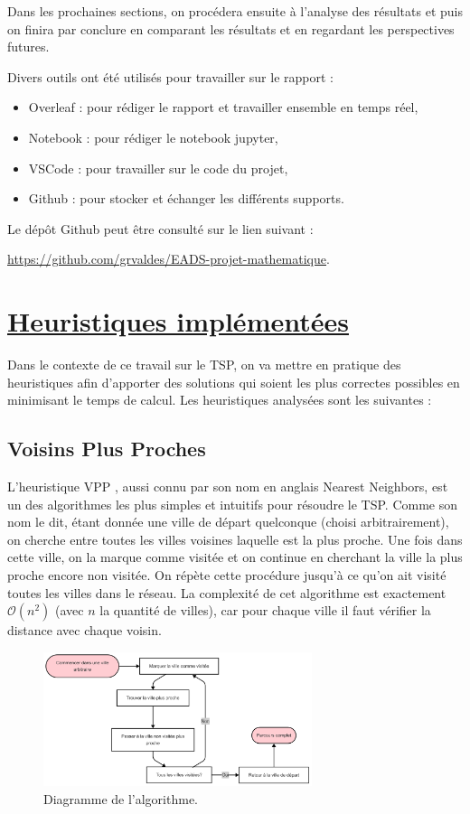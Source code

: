 \documentclass[a4paper,11pt,fleqn]{article}
\begin{document}
Dans les prochaines sections, on procédera ensuite à l’analyse des résultats et puis on finira par conclure en comparant les résultats et en regardant les perspectives futures.
\newline

Divers outils ont été utilisés pour travailler sur le rapport :
\begin{itemize}[noitemsep,topsep=5pt]
    \item Overleaf : pour rédiger le rapport et travailler ensemble en temps réel,
    \item Notebook : pour rédiger le notebook jupyter,
    \item VSCode : pour travailler sur le code du projet,
    \item Github : pour stocker et échanger les différents supports.
\end{itemize}

Le dépôt Github peut être consulté sur le lien suivant :

\noindent \url{https://github.com/grvaldes/EADS-projet-mathematique}.

\section*{\underline{Heuristiques implémentées}}
Dans le contexte de ce travail sur le TSP,  on va mettre en pratique des heuristiques afin d’apporter des solutions qui soient les plus correctes possibles en minimisant le temps de calcul.
Les heuristiques analysées sont les suivantes :
\subsection*{Voisins Plus Proches}
L'heuristique VPP \cite{article:nearest}, aussi connu par son nom en anglais Nearest Neighbors, est un des algorithmes les plus simples et intuitifs pour résoudre le TSP. Comme son nom le dit, étant donnée une ville de départ quelconque (choisi arbitrairement), on cherche entre toutes les villes voisines laquelle est la plus proche. Une fois dans cette ville, on la marque comme visitée et on continue en cherchant la ville la plus proche encore non visitée. On répète cette procédure jusqu'à ce qu'on ait visité toutes les villes dans le réseau. La complexité de cet algorithme est exactement $\mathcal{O}(n^2)$ (avec $n$ la quantité de villes), car pour chaque ville il faut vérifier la distance avec chaque voisin.

\begin{figure}[H]
    \centering
    \includegraphics[width=0.7\textwidth]{images/chart-nn.png}
    \caption{Diagramme de l'algorithme.}
    \label{fig:charte-nn}
\end{figure}
\end{document}
